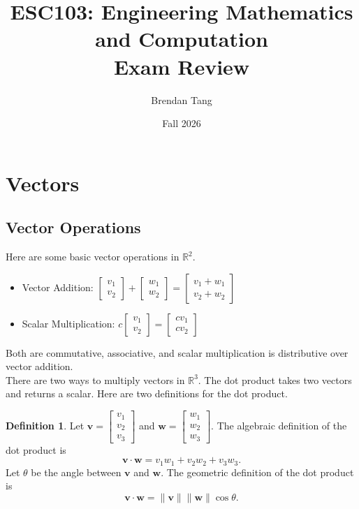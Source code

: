\documentclass[11pt]{scrartcl}
\title{ESC103: Engineering Mathematics and Computation \\[0.1in] Exam Review}
\author{Brendan Tang}
\date{Fall 2026}
\theoremstyle{plain}
\theoremstyle{definition}
\newtheorem*{definition}{Definition}
\theoremstyle{remark}
\begin{document}
\maketitle
\thispagestyle{empty}

\tableofcontents

\newpage
\section{Vectors}
\subsection{Vector Operations}

Here are some basic vector operations in $\mathbb{R}^{2}$. 

\begin{itemize}
    \item Vector Addition: $\begin{bmatrix}v_{1} \\ v_{2}\end{bmatrix}+\begin{bmatrix} w_{1} \\ w_{2}
    \end{bmatrix} = \begin{bmatrix}v_{1}+w_{1} \\ v_{2}+w_{2}\end{bmatrix}$
    \item Scalar Multiplication: $c\begin{bmatrix}v_{1} \\ v_{2}\end{bmatrix}=\begin{bmatrix}cv_{1} \\ cv_{2}
    \end{bmatrix}$
\end{itemize}

Both are commutative, associative, and scalar multiplication is distributive over vector addition. \\[-0.5em]

There are two ways to multiply vectors in $\mathbb{R}^{3}$. The dot product takes two vectors and returns a scalar. 
Here are two definitions for the dot product.

\begin{definition}
    Let $\mathbf{v}=\begin{bmatrix}v_{1} \\ v_{2} \\ v_{3}\end{bmatrix}$ and $\mathbf{w}=\begin{bmatrix}w_{1} \\ 
    w_{2} \\ w_{3}\end{bmatrix}$. The algebraic definition of the dot product is
    \[ \mathbf{v}\cdot \mathbf{w}=v_{1}w_{1}+v_{2}w_{2}+v_{3}w_{3}. \]
    Let $\theta$ be the angle between $\mathbf{v}$ and $\mathbf{w}$. The geometric definition of the dot product is 
    \[ \mathbf{v}\cdot \mathbf{w}=\lVert \mathbf{v} \rVert \lVert \mathbf{w} \rVert \cos \theta. \]
\end{definition}
\end{document}
